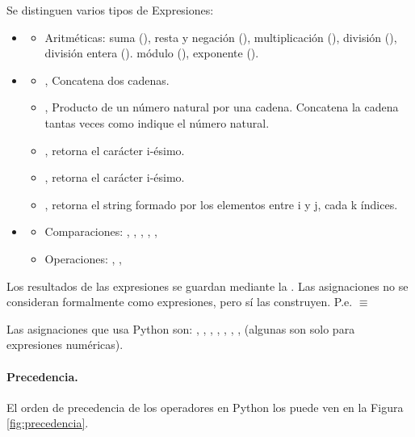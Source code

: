 Se distinguen varios tipos de Expresiones:

\begin{itemize}
\item {}
	\begin{itemize}
	\item Aritméticas: suma (\cm{+}), resta y negación (\cm{-}), multiplicación (\cm{*}), división (\cm{/}), división entera (\cm{//}). módulo (\cm{\%}), exponente (\cm{**}). 
	\end{itemize}

\item {}
	\begin{itemize}
	\item \cm{+}, Concatena  dos cadenas.
	\item \cm{*}, Producto de un número natural por una cadena. Concatena la cadena tantas veces como indique el número natural.
	\item {}, retorna el carácter i-ésimo.
	\item {}, retorna el carácter i-ésimo.
	\item {}, retorna el string formado por los elementos entre i y j, cada k índices.
	\end{itemize}
	
\item {}	
	\begin{itemize}
	\item Comparaciones: , , , , , 
	\item Operaciones: , , 
	\end{itemize}
\end{itemize}


Los resultados de las expresiones se guardan mediante la .
Las asignaciones no se consideran formalmente como expresiones, pero sí las construyen.
	P.e.   $\equiv$ 
	
Las asignaciones que usa Python son: \cm{=}, \cm{+=}, \cm{-=}, \cm{*=}, \cm{/=}, \cm{\%=}, \cm{//=}, \cm{**=} (algunas son solo para expresiones numéricas).


\paragraph{Precedencia.}
El orden de precedencia de los operadores en Python los puede ven en la Figura \ref{fig:precedencia}.

